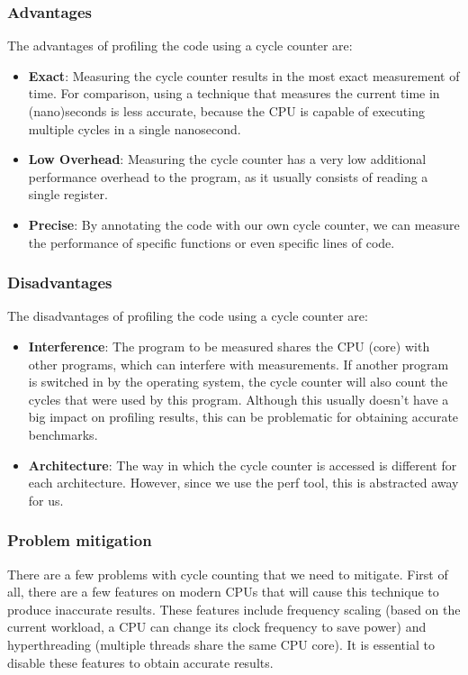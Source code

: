 \documentclass[11pt,a4paper]{report}
\theoremstyle{definition}
\begin{document}
\subsubsection{Advantages}
The advantages of profiling the code using a cycle counter are:
\begin{itemize}
  \item \textbf{Exact}: Measuring the cycle counter results in the most exact measurement of time. For comparison, using a technique that measures the current time in (nano)seconds is less accurate, because the CPU is capable of executing multiple cycles in a single nanosecond.
  \item \textbf{Low Overhead}: Measuring the cycle counter has a very low additional performance overhead to the program, as it usually consists of reading a single register.
  \item \textbf{Precise}: By annotating the code with our own cycle counter, we can measure the performance of specific functions or even specific lines of code.
\end{itemize}

\subsubsection{Disadvantages}
The disadvantages of profiling the code using a cycle counter are:
\begin{itemize}
  \item \textbf{Interference}: The program to be measured shares the CPU (core) with other programs, which can interfere with measurements. If another program is switched in by the operating system, the cycle counter will also count the cycles that were used by this program. Although this usually doesn't have a big impact on profiling results, this can be problematic for obtaining accurate benchmarks.
  \item \textbf{Architecture}: The way in which the cycle counter is accessed is different for each architecture. However, since we use the perf tool, this is abstracted away for us.
\end{itemize}

\subsubsection{Problem mitigation}
There are a few problems with cycle counting that we need to mitigate. First of all, there are a few features on modern CPUs that will cause this technique to produce inaccurate results. These features include frequency scaling (based on the current workload, a CPU can change its clock frequency to save power) and hyperthreading (multiple threads share the same CPU core). It is essential to disable these features to obtain accurate results.
\end{document}
